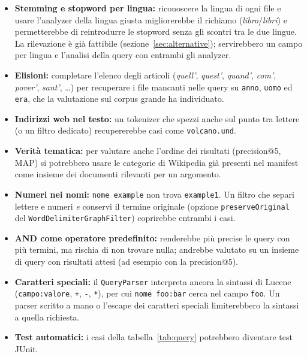 \documentclass[11pt,a4paper]{article}
\newcommand{\code}[1]{\texttt{#1}}
\begin{document}
\begin{itemize}
  \item \textbf{Stemming e stopword per lingua:} riconoscere la lingua di ogni file
        e usare l'analyzer della lingua giusta migliorerebbe il richiamo
        (\emph{libro}/\emph{libri}) e permetterebbe di reintrodurre le stopword
        senza gli scontri tra le due lingue. La rilevazione è già fattibile
        (sezione~\ref{sec:alternative}); servirebbero un campo per lingua e
        l'analisi della query con entrambi gli analyzer.
  \item \textbf{Elisioni:} completare l'elenco degli articoli (\emph{quell'},
        \emph{quest'}, \emph{quand'}, \emph{com'}, \emph{pover'}, \emph{sant'},
        \ldots) per recuperare i file mancanti nelle query su \code{anno},
        \code{uomo} ed \code{era}, che la valutazione sul corpus grande ha
        individuato.
  \item \textbf{Indirizzi web nel testo:} un tokenizer che spezzi anche sul punto
        tra lettere (o un filtro dedicato) recupererebbe casi come \code{volcano.und}.
  \item \textbf{Verità tematica:} per valutare anche l'ordine dei risultati
        (precision@5, MAP) si potrebbero usare le categorie di Wikipedia già
        presenti nel manifest come insieme dei documenti rilevanti per un argomento.
  \item \textbf{Numeri nei nomi:} \code{nome example} non trova \code{example1}.
        Un filtro che separi lettere e numeri \emph{e} conservi il termine
        originale (opzione \code{preserveOriginal} del
        \code{WordDelimiterGraphFilter}) coprirebbe entrambi i casi.
  \item \textbf{AND come operatore predefinito:} renderebbe più precise le query
        con più termini, ma rischia di non trovare nulla; andrebbe valutato su un
        insieme di query con risultati attesi (ad esempio con la precision@5).
  \item \textbf{Caratteri speciali:} il \code{QueryParser} interpreta ancora la
        sintassi di Lucene (\code{campo:valore}, \code{+}, \code{-}, \code{*}),
        per cui \code{nome foo:bar} cerca nel campo \code{foo}. Un parser scritto a
        mano o l'escape dei caratteri speciali limiterebbero la sintassi a quella
        richiesta.
  \item \textbf{Test automatici:} i casi della tabella~\ref{tab:query} potrebbero
        diventare test JUnit.
\end{itemize}
\end{document}
